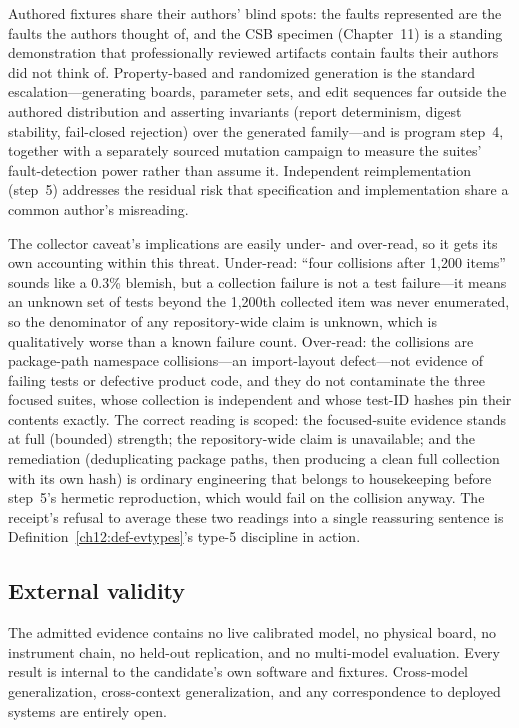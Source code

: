 Authored fixtures share their authors' blind spots: the faults represented are the faults the authors thought of, and the CSB specimen (Chapter~11) is a standing demonstration that professionally reviewed artifacts contain faults their authors did not think of. Property-based and randomized generation \cite{quickcheck} is the standard escalation---generating boards, parameter sets, and edit sequences far outside the authored distribution and asserting invariants (report determinism, digest stability, fail-closed rejection) over the generated family---and is program step~4, together with a separately sourced mutation campaign to measure the suites' fault-detection power rather than assume it. Independent reimplementation (step~5) addresses the residual risk that specification and implementation share a common author's misreading.

The collector caveat's implications are easily under- and over-read, so it gets its own accounting within this threat. Under-read: ``four collisions after 1{,}200 items'' sounds like a 0.3\% blemish, but a collection failure is not a test failure---it means an unknown set of tests beyond the 1{,}200th collected item was never enumerated, so the denominator of any repository-wide claim is unknown, which is qualitatively worse than a known failure count. Over-read: the collisions are package-path namespace collisions---an import-layout defect---not evidence of failing tests or defective product code, and they do not contaminate the three focused suites, whose collection is independent and whose test-ID hashes pin their contents exactly. The correct reading is scoped: the focused-suite evidence stands at full (bounded) strength; the repository-wide claim is unavailable; and the remediation (deduplicating package paths, then producing a clean full collection with its own hash) is ordinary engineering that belongs to housekeeping before step~5's hermetic reproduction, which would fail on the collision anyway. The receipt's refusal to average these two readings into a single reassuring sentence is Definition~\ref{ch12:def-evtypes}'s type-5 discipline in action.

\subsection{External validity}\label{ch12:threats-external}

\begin{threat}\label{ch12:threat-external}
The admitted evidence contains no live calibrated model, no physical board, no instrument chain, no held-out replication, and no multi-model evaluation. Every result is internal to the candidate's own software and fixtures. Cross-model generalization, cross-context generalization, and any correspondence to deployed systems are entirely open.
\end{threat}

